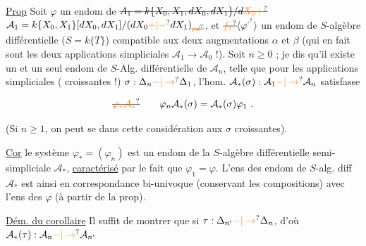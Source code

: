 

 \uline{Prop} Soit $\varphi$ un endom de $\deleted{A_1=k\{X_0,X_1,dX_0,dX_1\}/d\unsure{X_0+}}$ $\mathcal A_1=k\{X_0,X_1\}[dX_0,dX_1]/(dX_0\unsure{+|-}dX_1)_{\deleted{\unsure{pd}}}$, et $\deleted{\unsure{f_1}}\inserted{\varphi^{\unsure{\prime}}}$ un endom de $S$-algèbre différentielle ($S=k\{T\}$) compatible aux deux augmentations $\alpha$ et $\beta$ (qui en fait sont les deux applications simpliciales $\mathcal A_1\to\mathcal A_0$ !). Soit $n\geq0$ ; je dis qu'il existe un et un seul endom de $S$-Alg. différentielle de $\mathcal A_n$, telle que pour les applications simpliciales ( croissantes !) $\sigma:\Delta_n\unsure{-|\to}\Delta_1$, l'hom. $\mathcal A_*(\sigma):\mathcal A_1\unsure{-|\to}\mathcal A_n$ satisfasse

\[
\deleted{\unsure{\varphi_*\mathcal A_*}}\qquad\varphi_n\mathcal A_*(\sigma)=\mathcal A_*(\sigma)\varphi_1\ .
\]

 (Si $n\geq1$, on peut se   dans cette considération aux $\sigma$ croissantes).


\uline{Cor}  le système $\varphi_*=(\varphi_n)$ est un endom de la $S$-algèbre différentielle semi-simpliciale $\mathcal A_*$, \uline{caractérisé} par le fait que $\varphi_1=\varphi$. L'ens des endom de $S$-alg. diff $\mathcal A_*$ est ainsi en correspondance bi-univoque (conservant les compositions) avec l'ens des $\varphi$ 
(à partir de la prop).

\uline{Dém. du corollaire} Il suffit de montrer que si $\tau:\Delta_{n'}\unsure{-|\to}\Delta_n$, d'où $\mathcal A_*(\tau):\mathcal A_n\unsure{-|\to}\mathcal A_{n'}$

